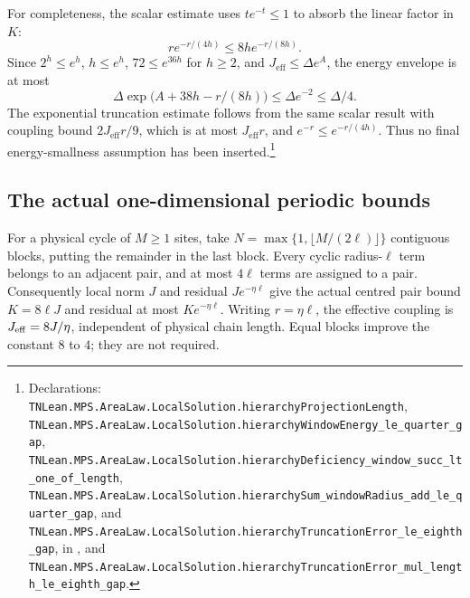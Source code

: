 \documentclass{article}
\providecommand{\leanid}[1]{\nolinkurl{#1}}
\begin{document}
For completeness, the scalar estimate uses $t e^{-t}\le1$ to absorb
the linear factor in $K$:
\[
 r e^{-r/(4h)}\le8h e^{-r/(8h)}.
\]
Since $2^h\le e^h$, $h\le e^h$, $72\le e^{36h}$ for $h\ge2$, and
$J_{\mathrm{eff}}\le\Delta e^A$, the energy envelope is at most
\[
 \Delta\exp\bigl(A+38h-r/(8h)\bigr)
 \le\Delta e^{-2}\le\Delta/4.
\]
The exponential truncation estimate follows from the same scalar result
with coupling bound $2J_{\mathrm{eff}}r/9$, which is at most
$J_{\mathrm{eff}}r$, and $e^{-r}\le e^{-r/(4h)}$.
Thus no final energy-smallness assumption has been inserted.\footnote{Declarations:
\leanid{TNLean.MPS.AreaLaw.LocalSolution.hierarchyProjectionLength},
\leanid{TNLean.MPS.AreaLaw.LocalSolution.hierarchyWindowEnergy_le_quarter_gap},
\leanid{TNLean.MPS.AreaLaw.LocalSolution.hierarchyDeficiency_window_succ_lt_one_of_length},
\leanid{TNLean.MPS.AreaLaw.LocalSolution.hierarchySum_windowRadius_add_le_quarter_gap}, and
\leanid{TNLean.MPS.AreaLaw.LocalSolution.hierarchyTruncationError_le_eighth_gap}, in
, and
\leanid{TNLean.MPS.AreaLaw.LocalSolution.hierarchyTruncationError_mul_length_le_eighth_gap}.}

\subsection{The actual one-dimensional periodic bounds}

For a physical cycle of $M\ge1$ sites, take
$N=\max\{1,\lfloor M/(2\ell)\rfloor\}$ contiguous blocks, putting the
remainder in the last block. Every cyclic radius-$\ell$ term belongs to
an adjacent pair, and at most $4\ell$ terms are assigned to a pair.
Consequently local norm $J$ and residual $Je^{-\eta\ell}$ give the actual
centred pair bound $K=8\ell J$ and residual at most $Ke^{-\eta\ell}$.
Writing $r=\eta\ell$, the effective coupling is $J_{\rm eff}=8J/\eta$,
independent of physical chain length. Equal blocks improve the constant
$8$ to $4$; they are not required.
\end{document}
